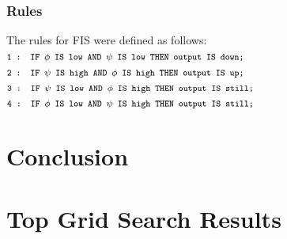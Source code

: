 \documentclass[10pt,journal,compsoc]{IEEEtran}
\begin{document}
\subsubsection*{Rules}
The rules for FIS were defined as follows: 
$\footnotesize{\texttt{1 : IF $\phi$ IS low AND $\psi$ IS low THEN output IS down;}}$
$\footnotesize{\texttt{2 : IF $\psi$ IS high AND $\phi$ IS high THEN output IS up;}}$
$\footnotesize{\texttt{3 : IF $\psi$ IS low AND $\phi$ IS high THEN output IS still;}}$
$\footnotesize{\texttt{4 : IF $\phi$ IS low AND $\psi$ IS high THEN output IS still;}}$

\section{Conclusion}

\appendices

\section{Top Grid Search Results}\label{app:models}

\end{document}
